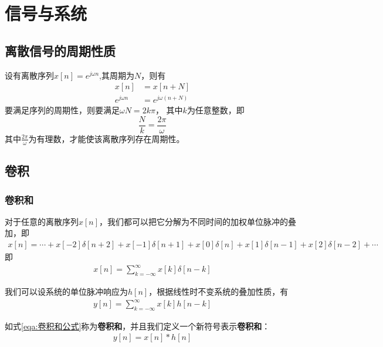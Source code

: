 \chapter{信号与系统}

\section{离散信号的周期性质}

设有离散序列$x[n] = e^{j\omega n}$,其周期为$N$，则有
\[
    \begin{aligned}
        x[n] &= x[n+N] \\
        e^{j\omega n} &= e^{j\omega (n+N)}
    \end{aligned}
\]
要满足序列的周期性，则要满足$\omega N = 2k\pi$，
其中$k$为任意整数，即
\begin{equation}
    \frac{N}{k} = \frac{2\pi}{\omega}
    \label{eqa:离散信号的周期性质结论}
\end{equation}
其中$\frac{2\pi}{\omega}$为有理数，才能使该离散序列存在周期性。

\section{卷积}

\subsection{卷积和}

对于任意的离散序列$x[n]$，我们都可以把它分解为不同时间的加权单位脉冲的叠加，即
\begin{equation}
    \begin{aligned}
        x[n] = \cdots +x[-2]\delta[n+2]+x[-1]\delta[n+1]+x[0]\delta[n]
            +x[1]\delta[n-1]+x[2]\delta[n-2]+\cdots
    \end{aligned}
    \label{eqa:卷积和1}
\end{equation}
即
\begin{equation}
    \begin{aligned}
        x[n] = \sum_{k=-\infty}^{\infty}x[k]\delta[n-k]
    \end{aligned}
    \label{eqa:卷积和2}
\end{equation}

我们可以设系统的单位脉冲响应为$h[n]$，根据线性时不变系统的叠加性质，有
\begin{equation}
    \begin{aligned}
        y[n] = \sum_{k=-\infty}^{\infty}x[k]h[n-k]
    \end{aligned}
    \label{eqa:卷积和公式}
\end{equation}

如式\ref{eqa:卷积和公式}称为\textbf{卷积和}，并且我们定义一个新符号表示\textbf{卷积和}：
\begin{equation}
    \begin{aligned}
        y[n] = x[n]*h[n]
    \end{aligned}
    \label{eqa:卷积和符号}
\end{equation}

